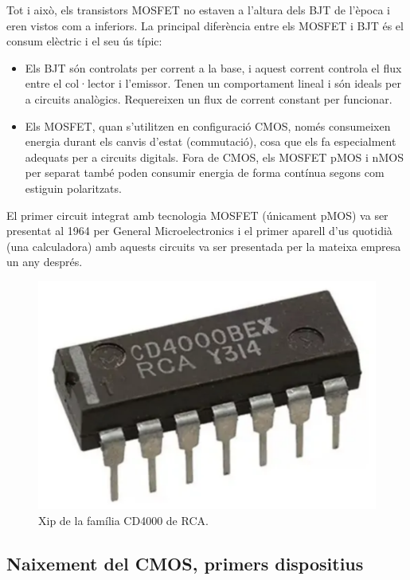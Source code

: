 \documentclass[11pt,a4paper]{article}
\begin{document}
Tot i això, els transistors MOSFET no estaven a l'altura dels BJT de l'època i eren vistos com a inferiors. La principal diferència entre els MOSFET i BJT és el consum elèctric i el seu ús típic: 
\\
\begin{itemize}
    \item Els BJT són controlats per corrent a la base, i aquest corrent controla el flux entre el col·lector i l'emissor. Tenen un comportament lineal i són ideals per a circuits analògics. Requereixen un flux de corrent constant per funcionar.
    \item Els MOSFET, quan s'utilitzen en configuració CMOS, només consumeixen energia durant els canvis d'estat (commutació), cosa que els fa especialment adequats per a circuits digitals. Fora de CMOS, els MOSFET pMOS i nMOS per separat també poden consumir energia de forma contínua segons com estiguin polaritzats.
\end{itemize}


El primer circuit integrat amb tecnologia MOSFET (únicament pMOS) va ser presentat al 1964 per General Microelectronics i el primer aparell d'us quotidià (una calculadora) amb aquests circuits va ser presentada per la mateixa empresa un any després\autocite{general_microelectronics}.
\begin{figure}
    \centering
    \includegraphics[width=\linewidth]{images/rca cd4000 chip.png}
    \caption{Xip de la família CD4000 de RCA.}
    \vspace{-1.3cm}
\end{figure}

\subsection{Naixement del CMOS, primers dispositius}
\end{document}
